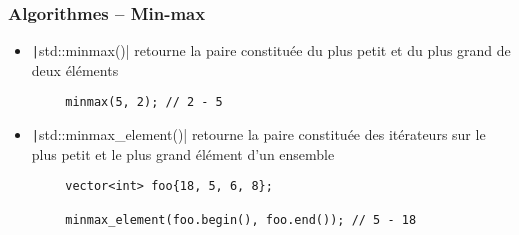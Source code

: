 \documentclass[C++.tex]{subfiles}
\begin{document}
\begin{frame}[fragile]
	\frametitle{Algorithmes -- Min-max}
	\begin{itemize}
		\item \texttt|std::minmax()| retourne la paire constituée du plus petit et du plus grand de deux éléments
	\end{itemize}

	\begin{verbatim}
		minmax(5, 2); // 2 - 5
	\end{verbatim}

	\begin{itemize}
		\item \texttt|std::minmax_element()| retourne la paire constituée des itérateurs sur le plus petit et le plus grand élément d'un ensemble
	\end{itemize}

	\begin{verbatim}
		vector<int> foo{18, 5, 6, 8};

		minmax_element(foo.begin(), foo.end()); // 5 - 18
	\end{verbatim}


\end{frame}
\end{document}
